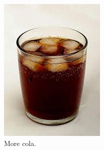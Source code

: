 \documentclass{article}
\begin{document}
\begin{figure}[h!]
\begin{subfigure}[b]{0.2\linewidth}
	    \includegraphics[width=\linewidth]{drink.jpg}
	    \caption{More cola.}
	    \end{subfigure}
         \begin{subfigure}[b]{0.2\linewidth}

\end{subfigure}
\end{figure}
\end{document}
